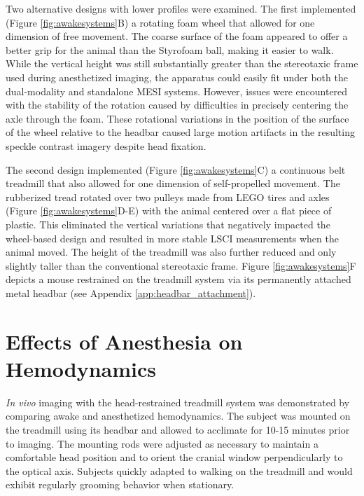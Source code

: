 Two alternative designs with lower profiles were examined. The first implemented (Figure \ref{fig:awakesystems}B) a rotating foam wheel \cite{Heiney:2018gq} that allowed for one dimension of free movement. The coarse surface of the foam appeared to offer a better grip for the animal than the Styrofoam ball, making it easier to walk. While the vertical height was still substantially greater than the stereotaxic frame used during anesthetized imaging, the apparatus could easily fit under both the dual-modality and standalone MESI systems. However, issues were encountered with the stability of the rotation caused by difficulties in precisely centering the axle through the foam. These rotational variations in the position of the surface of the wheel relative to the headbar caused large motion artifacts in the resulting speckle contrast imagery despite head fixation.

The second design implemented (Figure \ref{fig:awakesystems}C) a continuous belt treadmill \cite{Royer:2012gw, Kaifosh:2013fy} that also allowed for one dimension of self-propelled movement. The rubberized tread rotated over two pulleys made from LEGO tires and axles (Figure \ref{fig:awakesystems}D-E) with the animal centered over a flat piece of plastic. This eliminated the vertical variations that negatively impacted the wheel-based design and resulted in more stable LSCI measurements when the animal moved. The height of the treadmill was also further reduced and only slightly taller than the conventional stereotaxic frame. Figure \ref{fig:awakesystems}F depicts a mouse restrained on the treadmill system via its permanently attached metal headbar (see Appendix \ref{app:headbar_attachment}).



\section{Effects of Anesthesia on Hemodynamics}

\textit{In vivo} imaging with the head-restrained treadmill system was demonstrated by comparing awake and anesthetized hemodynamics. The subject was mounted on the treadmill using its headbar and allowed to acclimate for 10-15 minutes prior to imaging. The mounting rods were adjusted as necessary to maintain a comfortable head position and to orient the cranial window perpendicularly to the optical axis. Subjects quickly adapted to walking on the treadmill and would exhibit regularly grooming behavior when stationary.

